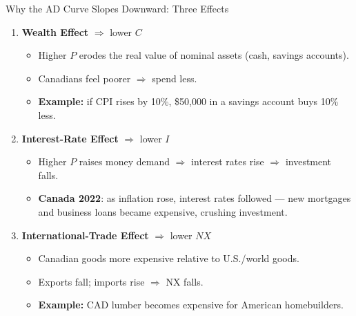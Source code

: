\documentclass[aspectratio=169]{beamer}
\begin{document}
\begin{frame}{Why the AD Curve Slopes Downward: Three Effects}
\transfade
\begin{enumerate}[<+->]
  \item \textbf{Wealth Effect} $\Rightarrow$ lower $C$
  \begin{itemize}[<+->]
    \item Higher $P$ erodes the real value of nominal assets (cash, savings accounts).
    \item Canadians feel poorer $\Rightarrow$ spend less.
    \item \textbf{Example:} if CPI rises by 10\%, \$50{,}000 in a savings account buys 10\% less.
  \end{itemize}
  \item \textbf{Interest-Rate Effect} $\Rightarrow$ lower $I$
  \begin{itemize}[<+->]
    \item Higher $P$ raises money demand $\Rightarrow$ interest rates rise $\Rightarrow$ investment falls.
    \item \textbf{Canada 2022}: as inflation rose, interest rates followed --- new mortgages and business loans became expensive, crushing investment.
  \end{itemize}
  \item \textbf{International-Trade Effect} $\Rightarrow$ lower $NX$
  \begin{itemize}[<+->]
    \item Canadian goods more expensive relative to U.S./world goods.
    \item Exports fall; imports rise $\Rightarrow$ NX falls.
    \item \textbf{Example:} CAD lumber becomes expensive for American homebuilders.
  \end{itemize}
\end{enumerate}
\end{frame}
\end{document}
